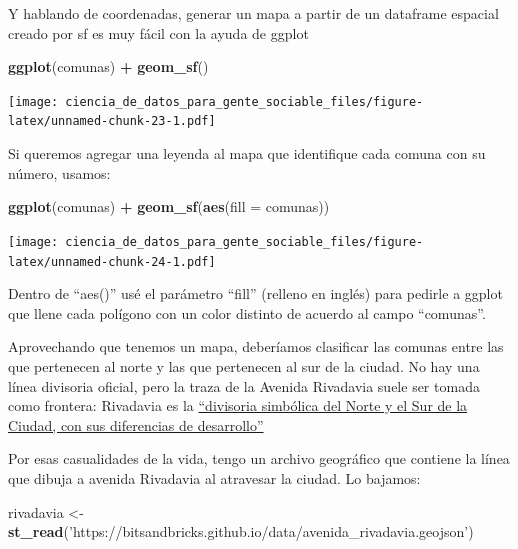 \documentclass[]{book}
\newenvironment{Shaded}{\begin{snugshade}}{\end{snugshade}}
\newcommand{\KeywordTok}[1]{\textcolor[rgb]{0.13,0.29,0.53}{\textbf{#1}}}
\newcommand{\DataTypeTok}[1]{\textcolor[rgb]{0.13,0.29,0.53}{#1}}
\newcommand{\StringTok}[1]{\textcolor[rgb]{0.31,0.60,0.02}{#1}}
\newcommand{\OperatorTok}[1]{\textcolor[rgb]{0.81,0.36,0.00}{\textbf{#1}}}
\newcommand{\NormalTok}[1]{#1}
\begin{document}
Y hablando de coordenadas, generar un mapa a partir de un dataframe
espacial creado por sf es muy fácil con la ayuda de ggplot

\begin{Shaded}
\begin{Highlighting}[]
\KeywordTok{ggplot}\NormalTok{(comunas) }\OperatorTok{+}
\StringTok{    }\KeywordTok{geom_sf}\NormalTok{()}
\end{Highlighting}
\end{Shaded}

\texttt{[image: ciencia\_de\_datos\_para\_gente\_sociable\_files/figure-latex/unnamed-chunk-23-1.pdf]}

Si queremos agregar una leyenda al mapa que identifique cada comuna con
su número, usamos:

\begin{Shaded}
\begin{Highlighting}[]
\KeywordTok{ggplot}\NormalTok{(comunas) }\OperatorTok{+}
\StringTok{    }\KeywordTok{geom_sf}\NormalTok{(}\KeywordTok{aes}\NormalTok{(}\DataTypeTok{fill =}\NormalTok{ comunas))}
\end{Highlighting}
\end{Shaded}

\texttt{[image: ciencia\_de\_datos\_para\_gente\_sociable\_files/figure-latex/unnamed-chunk-24-1.pdf]}

Dentro de ``aes()'' usé el parámetro ``fill'' (relleno en inglés) para
pedirle a ggplot que llene cada polígono con un color distinto de
acuerdo al campo ``comunas''.

Aprovechando que tenemos un mapa, deberíamos clasificar las comunas
entre las que pertenecen al norte y las que pertenecen al sur de la
ciudad. No hay una línea divisoria oficial, pero la traza de la Avenida
Rivadavia suele ser tomada como frontera: Rivadavia es la
\href{https://www.clarin.com/ediciones-anteriores/avenida-rivadaviaun-largo-recorrido-contrastes_0_B1reo181CYe.html}{``divisoria
simbólica del Norte y el Sur de la Ciudad, con sus diferencias de
desarrollo''}

Por esas casualidades de la vida, tengo un archivo geográfico que
contiene la línea que dibuja a avenida Rivadavia al atravesar la ciudad.
Lo bajamos:

\begin{Shaded}
\begin{Highlighting}[]
\NormalTok{rivadavia <-}\StringTok{ }\KeywordTok{st_read}\NormalTok{(}\StringTok{'https://bitsandbricks.github.io/data/avenida_rivadavia.geojson'}\NormalTok{)}
\end{Highlighting}
\end{Shaded}
\end{document}
